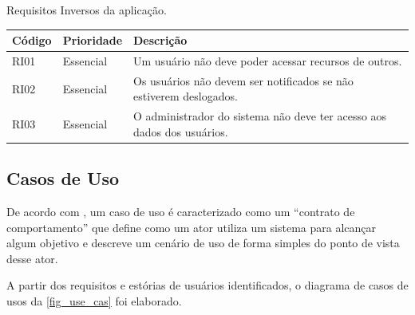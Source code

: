 \begin{quadro}[htb]
    \begin{center}
        \ABNTEXfontereduzida
        \caption{Requisitos Inversos da aplicação.}
        \label{tab-req-inv}
        \begin{tabular}{p{1.1cm}|p{1.5cm}|p{10.5cm}}
            \textbf{Código} & \textbf{Prioridade} & \textbf{Descrição}         \\
            \hline
            RI01            & Essencial           &
            Um usuário não deve poder acessar recursos de outros.              \\
            \hline
            RI02            & Essencial           &
            Os usuários não devem ser notificados se não estiverem deslogados. \\
            \hline
            RI03            & Essencial           &
            O administrador do sistema não deve ter acesso aos dados dos usuários.
        \end{tabular}
    \end{center}
\end{quadro}

\newpage

\subsection{Casos de Uso}

De acordo com , um caso de uso é caracterizado como um ``contrato de comportamento'' que define como
um ator utiliza um sistema para alcançar algum objetivo e descreve um cenário de uso de forma simples do ponto de vista desse ator.

A partir dos requisitos e estórias de usuários identificados, o diagrama de casos de usos da \autoref{fig_use_cas} foi elaborado.

